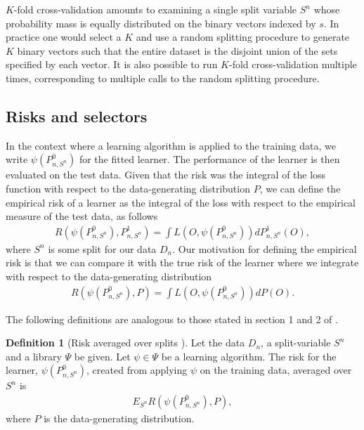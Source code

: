 \documentclass[11pt, a4paper]{article}
\theoremstyle{definition}
\newtheorem{definition}[theorem]{Definition}
\theoremstyle{remark}
\newcommand{\la}{\psi}
\newcommand{\Sn}{S^n}
\newcommand{\lib}{\Psi}
\begin{document}
$ K $-fold cross-validation amounts to examining a single split variable $ \Sn $ whose probability mass is equally distributed on the binary vectors indexed by $ s $. In practice one would select a $ K $ and use a random splitting procedure to generate $ K $ binary vectors such that the entire dataset is the disjoint union of the sets specified by each vector. It is also possible to run $ K $-fold cross-validation multiple times, corresponding to multiple calls to the random splitting procedure.
\subsection{Risks and selectors}
In the context where a learning algorithm is applied to the training data, we write $ \la(P_{n, S^{n}}^{0}) $ for the fitted learner. The performance of the learner is then evaluated on the test data. Given that the risk  was the integral of the loss function with respect to the data-generating distribution $P$, we can define the empirical risk of a learner as the integral of the loss with respect to the empirical measure of the test data, as follows
 \begin{align*}
     R(\la(P_{n, S^{n}}^{0}), P_{n, \Sn}^{1}) =  \int L(O, \la(P_{n, S^{n}}^{0})) d P_{n,\Sn}^{1}(O),
 \end{align*}
where $\Sn$ is some split for our data $D_n$. Our motivation for defining the empirical risk is that we can compare it with the true risk of the learner where we integrate with respect to the data-generating distribution 
\begin{align*}
     R(\la(P_{n, S^{n}}^{0}), P) =  \int L(O, \la(P_{n, S^{n}}^{0})) d P(O).
\end{align*}

The following definitions are analogous to those stated in section 1 and 2 of  \parencite{laan03}.
 \begin{definition}[Risk averaged over splits \parencite{vaart06}]
     Let the data $D_n$, a split-variable $\Sn$ and a library $ \lib $ be given. Let $ \la \in \lib $ be a learning algorithm. The risk for the learner, $\la(P_{n,\Sn}^0)$, created from applying $ \la $ on the training data, averaged over $ \Sn $ is  
    \begin{align*}
        E_{\Sn} R( \la(P_{n,\Sn}^{0}), P),
    \end{align*}
    where $ P $ is the data-generating distribution.
\end{definition}
\end{document}
